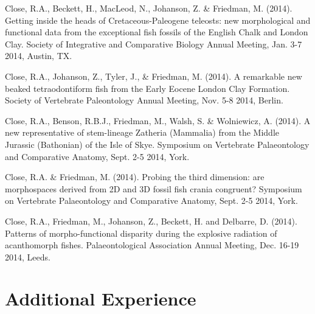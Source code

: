 \documentclass[a4paper, oneside, final]{scrartcl} %
\begin{document}
\begin{center}
\begin{flushleft}
\vspace{6pt}

Close, R.A., Beckett, H., MacLeod, N., Johanson, Z. \& Friedman, M. (2014). Getting inside the heads of Cretaceous-Paleogene teleosts: new morphological and functional data from the exceptional fish fossils of the English Chalk and London Clay. Society of Integrative and Comparative Biology Annual Meeting, Jan. 3-7 2014, Austin, TX.\\

\vspace{6pt}

Close, R.A., Johanson, Z., Tyler, J., \& Friedman, M. (2014). A remarkable new beaked tetraodontiform fish from the Early Eocene London Clay Formation. Society of Vertebrate Paleontology Annual Meeting, Nov. 5-8 2014, Berlin.\\

\vspace{6pt}

Close, R.A., Benson, R.B.J., Friedman, M., Walsh, S. \& Wolniewicz, A. (2014). A new representative of stem-lineage Zatheria (Mammalia) from the Middle Jurassic (Bathonian) of the Isle of Skye. Symposium on Vertebrate Palaeontology and Comparative Anatomy, Sept. 2-5 2014, York.\\

\vspace{6pt}

Close, R.A. \& Friedman, M. (2014). Probing the third dimension: are morphospaces derived from 2D and 3D fossil fish crania congruent? Symposium on Vertebrate Palaeontology and Comparative Anatomy, Sept. 2-5 2014, York.\\

\vspace{6pt}

Close, R.A., Friedman, M., Johanson, Z., Beckett, H. and Delbarre, D. (2014). Patterns of morpho-functional disparity during the explosive radiation of acanthomorph fishes. Palaeontological Association Annual Meeting, Dec. 16-19 2014, Leeds.\\

\end{flushleft}



\section{Additional Experience}


\end{center}
\end{document}
